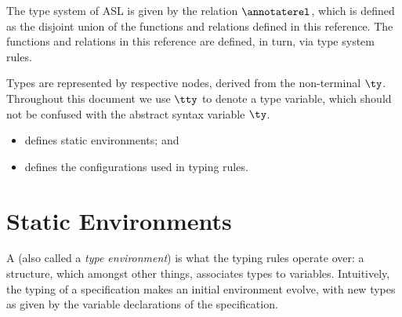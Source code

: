 \hypertarget{def-annotaterel}{}
The type system of ASL is given by the relation $\annotaterel$, which is defined as the disjoint union
of the functions and relations defined in this reference.
The functions and relations in this reference are defined, in turn, via type system rules.

Types are represented by respective \typedast{} nodes, derived from the non-terminal $\ty$.
Throughout this document we use $\tty$ to denote a type variable, which should not be confused with the abstract syntax variable $\ty$.

\ChapterOutline
\begin{itemize}
  \item {} defines static environments; and
  \item {} defines the configurations used in typing rules.
\end{itemize}

\section{Static Environments\label{sec:StaticEnvironments}}
A \emph{\staticenvironmentterm{}} (also called a \emph{type environment}) is what the typing rules operate over:
a structure, which amongst other things, associates types to variables.
Intuitively, the typing of a specification makes an initial environment evolve, with new types as given by the
variable declarations of the specification.

